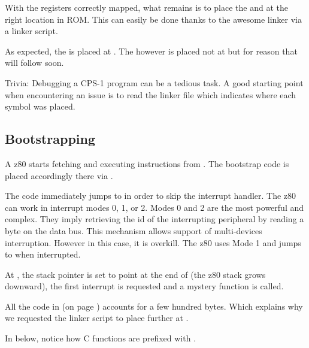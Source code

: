 With the registers correctly mapped, what remains is to place the  and  at the right location in ROM. This can easily be done thanks to the awesome  linker via a linker script.



As expected, the  is placed at . The  however is placed not at  but  for reason that will follow soon.

\begin{trivia}
Trivia: Debugging a CPS-1 program can be a tedious task. A good starting point when encountering an issue is to read the linker  file which indicates where each symbol was placed.
\end{trivia}

\subsection{Bootstrapping}
A z80 starts fetching and executing instructions from . The bootstrap code  is placed accordingly there via .

The code immediately jumps to  in order to skip the interrupt handler. The z80 can work in interrupt modes 0, 1, or 2. Modes 0 and 2 are the most powerful and complex. They imply retrieving the id of the interrupting peripheral by reading a byte on the data bus. This mechanism allows support of multi-devices interruption. However in this case, it is overkill. The z80 uses Mode 1 and jumps to  when interrupted.

At , the stack pointer  is set to point at the end of  (the z80 stack grows downward), the first interrupt is requested and a mystery  function is called.

All the code in  (on page \pageref{z80_crt0}) accounts for a few hundred bytes. Which explains why we requested the linker script to place  further at .

In  below, notice how C functions are prefixed with \icode{\_}.
\pagebreak


\label{z80_crt0}







